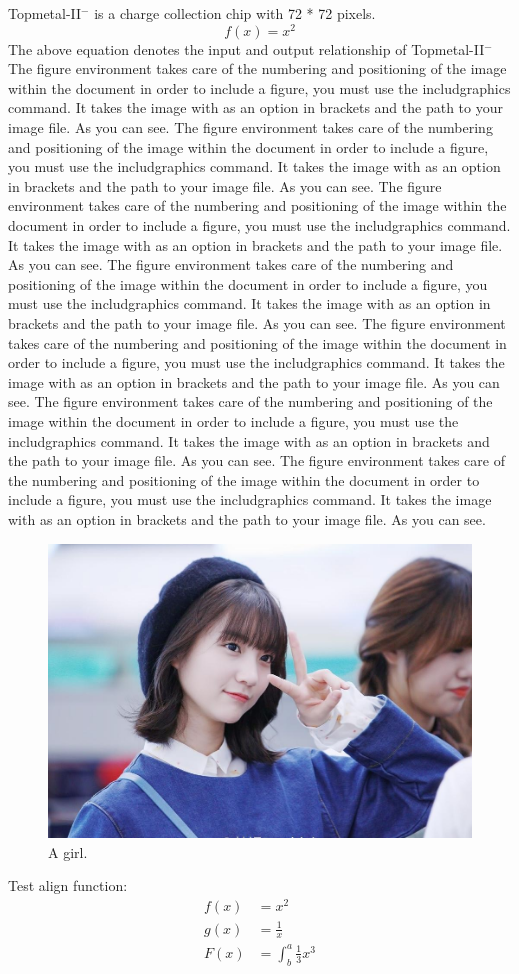 \documentclass[18pt]{article}
\begin{document}
Topmetal-II$^-$ is a charge collection chip with 72 * 72 pixels.
\begin{equation}
f(x) = x^2 
\end{equation}
The above equation denotes the input and output relationship of Topmetal-II$^-$
The figure environment takes care of the numbering and positioning of the image within the document in order to include a figure, you must use the includgraphics command. It takes the image with as an option in brackets and the path to your image file.  As you can see.
The figure environment takes care of the numbering and positioning of the image within the document in order to include a figure, you must use the includgraphics command. It takes the image with as an option in brackets and the path to your image file.  As you can see.
The figure environment takes care of the numbering and positioning of the image within the document in order to include a figure, you must use the includgraphics command. It takes the image with as an option in brackets and the path to your image file.  As you can see.
The figure environment takes care of the numbering and positioning of the image within the document in order to include a figure, you must use the includgraphics command. It takes the image with as an option in brackets and the path to your image file.  As you can see.
The figure environment takes care of the numbering and positioning of the image within the document in order to include a figure, you must use the includgraphics command. It takes the image with as an option in brackets and the path to your image file.  As you can see.
The figure environment takes care of the numbering and positioning of the image within the document in order to include a figure, you must use the includgraphics command. It takes the image with as an option in brackets and the path to your image file.  As you can see.
The figure environment takes care of the numbering and positioning of the image within the document in order to include a figure, you must use the includgraphics command. It takes the image with as an option in brackets and the path to your image file.  As you can see.
\begin{figure}
    \includegraphics[width=\linewidth]{./Img/A_Girl.jpg}
    \caption{A girl.}
    \label{fig:boat1}
\end{figure}

Test align function: 
\begin{align*}
f(x) &= x^2\\
g(x) &= \frac{1}{x}\\
F(x) &= \int^a_b \frac{1}{3}x^3
\end{align*}
\end{document}
